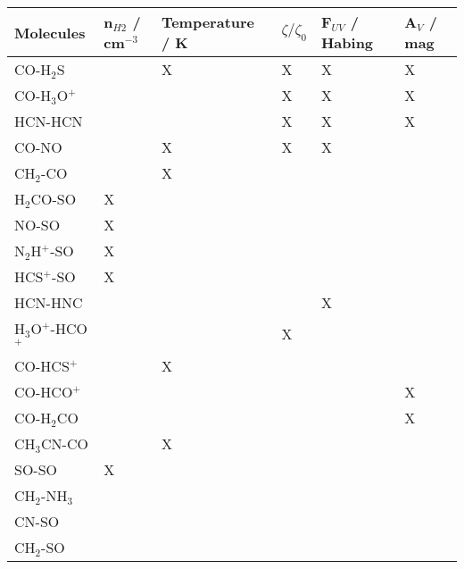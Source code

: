 \begin{tabular}{llllll}
\toprule
         Molecules & n$_{H2}$ / cm$^{-3}$ & Temperature / K & $\zeta/\zeta_0$ & F$_{UV}$ / Habing & A$_V$ / mag \\
\midrule
         CO-H$_2$S &                      &               X &               X &                 X &           X \\
     CO-H$_3$O$^+$ &                      &                 &               X &                 X &           X \\
           HCN-HCN &                      &                 &               X &                 X &           X \\
             CO-NO &                      &               X &               X &                 X &             \\
         CH$_2$-CO &                      &               X &                 &                   &             \\
        H$_2$CO-SO &                    X &                 &                 &                   &             \\
             NO-SO &                    X &                 &                 &                   &             \\
     N$_2$H$^+$-SO &                    X &                 &                 &                   &             \\
        HCS$^+$-SO &                    X &                 &                 &                   &             \\
           HCN-HNC &                      &                 &                 &                 X &             \\
H$_3$O$^+$-HCO$^+$ &                      &                 &               X &                   &             \\
        CO-HCS$^+$ &                      &               X &                 &                   &             \\
        CO-HCO$^+$ &                      &                 &                 &                   &           X \\
        CO-H$_2$CO &                      &                 &                 &                   &           X \\
       CH$_3$CN-CO &                      &               X &                 &                   &             \\
             SO-SO &                    X &                 &                 &                   &             \\
     CH$_2$-NH$_3$ &                      &                 &                 &                   &             \\
             CN-SO &                      &                 &                 &                   &             \\
         CH$_2$-SO &                      &                 &                 &                   &             \\
\bottomrule
\end{tabular}
